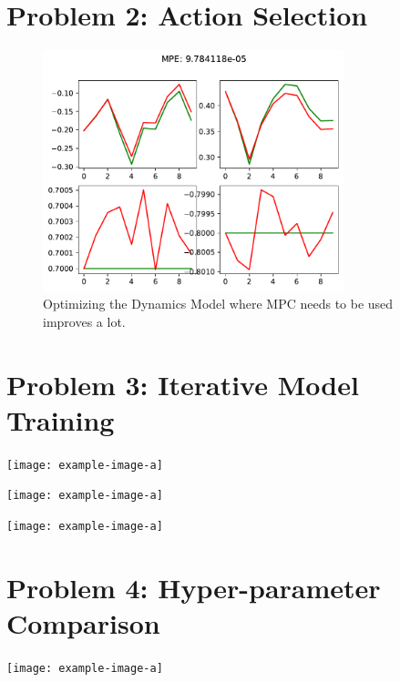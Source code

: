 \documentclass{article}
\begin{document}
\section{Problem 2: Action Selection}
\begin{answer}[title=Plot,height=9.5cm,width=\linewidth]
    \begin{figure}[H]
        \centering
        \includegraphics[height=7cm]{figs/P2.pdf}
        \caption{Optimizing the Dynamics Model where MPC needs to be used improves a lot.}
    \end{figure}
\end{answer}



\section{Problem 3: Iterative Model Training}
\begin{answer}[title=Plot,height=9.5cm,width=\linewidth]
    \centering
    \texttt{[image: example-image-a]}
\end{answer}

\begin{answer}[title=Plot,height=9.5cm,width=\linewidth]
    \centering
    \texttt{[image: example-image-a]}
\end{answer}

\begin{answer}[title=Plot,height=9.5cm,width=\linewidth]
    \centering
    \texttt{[image: example-image-a]}
\end{answer}

\section{Problem 4: Hyper-parameter Comparison}
\begin{answer}[title=Plot,height=9.5cm,width=\linewidth]
    \centering
    \texttt{[image: example-image-a]}
\end{answer}
\end{document}
